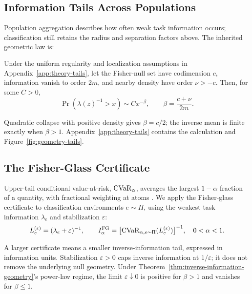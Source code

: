 \subsection{Information Tails Across Populations}
\label{sec:collapse-geometry}

Population aggregation describes how often weak task information occurs; classification still retains the radius and separation factors above. The inherited geometric law is:
\begin{theorem}
\label{thm:inverse-information-geometry}
Under the uniform regularity and localization assumptions in Appendix~\ref{app:theory-tails}, let the Fisher-null set have codimension $c$, information vanish to order $2m$, and nearby density have order $\nu>-c$. Then, for some $C>0$,
\begin{equation}
\Pr(\lambda(z)^{-1}>x)\sim Cx^{-\beta},
\qquad \beta=\frac{c+\nu}{2m}.
\label{eq:inverse-information-tail-exponent}
\end{equation}
\end{theorem}
Quadratic collapse with positive density gives $\beta=c/2$; the inverse mean is finite exactly when $\beta>1$. Appendix~\ref{app:theory-tails} contains the calculation and Figure~\ref{fig:geometry-tails}.

\begin{samepage}
\subsection{The Fisher-Glass Certificate}
\label{sec:fg-certificate}

Upper-tail conditional value-at-risk, $\operatorname{CVaR}_\alpha$, averages the largest $1-\alpha$ fraction of a quantity, with fractional weighting at atoms \citep{rockafellar2000optimization,rockafellar2002conditional}. We apply the Fisher-glass certificate \citep{mansouri_arai_2026_fisher_glasses} to classification environments $e\sim\Pi$, using the weakest task information $\lambda_e$ and stabilization $\varepsilon$:
\begin{equation}
L_e^{(\varepsilon)}=(\lambda_e+\varepsilon)^{-1},
\qquad
I_\alpha^{\mathrm{FG}}=\bigl[\operatorname{CVaR}_{\alpha,e\sim\Pi}(L_e^{(\varepsilon)})\bigr]^{-1},
\quad 0<\alpha<1.
\label{eq:fisher-glass-certificate}
\end{equation}
\end{samepage}
A larger certificate means a smaller inverse-information tail, expressed in information units. Stabilization $\varepsilon>0$ caps inverse information at $1/\varepsilon$; it does not remove the underlying null geometry. Under Theorem~\ref{thm:inverse-information-geometry}'s power-law regime, the limit $\varepsilon\downarrow0$ is positive for $\beta>1$ and vanishes for $\beta\le1$.

